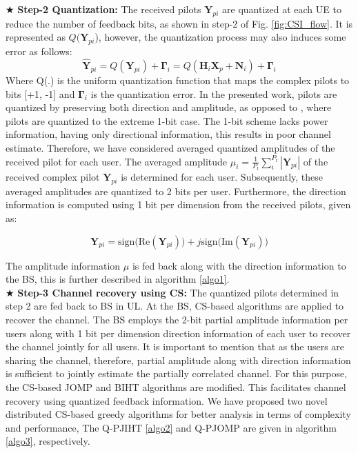    
$\bigstar$ \textbf{Step-2 Quantization:}
The received pilots $\mathbf{Y}_{pi}$ are quantized at each UE to reduce the number of feedback bits, as shown in step-2 of Fig. \ref{fig:CSI_flow}. It is represented as $Q(\mathbf{Y}_{pi}$), however, the quantization process may also induces some error as follows: 
\begin{equation}
\mathbf{\hat{Y}}_{pi} =Q(\mathbf{Y}_{pi})+ \mathbf{\Gamma}_i
 = Q(\mathbf{H}_i \mathbf{X}_p + \mathbf{N}_i) + \mathbf{\Gamma}_i
\label{eq_qunatization}
\end{equation}
Where Q(.) is the uniform quantization function that maps the complex pilots to bits [+1, -1] and $\mathbf{\Gamma}_i$ is the quantization error. In the presented work, pilots are quantized by preserving both direction and amplitude, as opposed to \cite{mainref-1bit}, where pilots are quantized to the extreme 1-bit case. The 1-bit scheme lacks power information, having only directional information, this results in poor channel estimate. Therefore, we have considered averaged quantized amplitudes of the received pilot for each user. The averaged amplitude  $\mu_i=\frac{1}{P_t} \sum_i^{P_t} |\mathbf{Y}_{pi}|$ of the received complex pilot $\mathbf{Y}_{pi}$ is determined for each user.  Subsequently, these averaged amplitudes are quantized to 2 bits per user.  Furthermore, the direction information is  computed using 1 bit per dimension from the received pilots, given as:

\begin{equation}
\mathbf{Y}_{pi}=\text{sign(Re}(\mathbf{Y}_{pi}))+j\text{sign(Im}(\mathbf{Y}_{pi})) 
\label{eq_qunatization}
\end{equation}

The amplitude information $\mu$ is fed back along with the direction information to the BS,  this is further described in algorithm \ref{algo1}. \\
  
 
$\bigstar$ \textbf{Step-3 Channel recovery using CS:}
The quantized pilots determined in step 2 are fed back to BS in UL. At the BS, CS-based algorithms are applied to recover the channel. The BS employs the 2-bit partial amplitude information per users along with 1 bit per dimension direction information of each user to recover the channel jointly for all users. It is important to mention that as the users are sharing the channel, therefore, partial amplitude along with direction information is sufficient to jointly estimate the partially correlated channel. For this purpose, the CS-based JOMP \cite{mainref-joint} and BIHT algorithms \cite{mainref-1bit} are modified. This facilitates channel recovery using quantized feedback information.  We have proposed two novel distributed CS-based greedy algorithms for better analysis in terms of complexity and performance, The Q-PJIHT  \ref{algo2} and Q-PJOMP are given in algorithm \ref{algo3}, respectively. 

